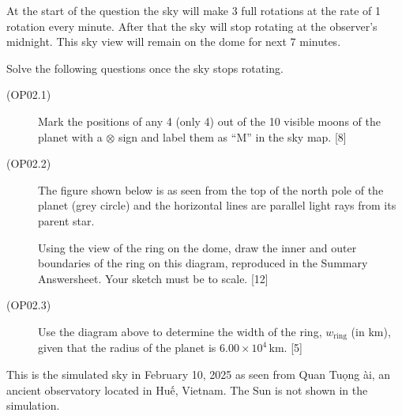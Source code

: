 At the start of the question the sky will make 3 full rotations at the rate
of 1 rotation every minute. After that the sky will stop rotating at the
observer's midnight. This sky view will remain on the dome for next 7
minutes.

Solve the following questions once the sky stops rotating.


\begin{description}
\item[(OP02.1)] Mark the positions of any 4 (only 4) out of the 10 visible
  moons of the planet with a $\otimes$ sign and label them as ``M'' in the
  sky map. \hfill[8]
\item[(OP02.2)] The figure shown below is as seen from the top of the north
  pole of the planet (grey circle) and the horizontal lines are parallel
  light rays from its parent star.


  Using the view of the ring on the dome, draw the inner and outer boundaries
  of the ring on this diagram, reproduced in the Summary Answersheet. Your
  sketch must be to scale. \hfill[12]
\item[(OP02.3)] Use the diagram above to determine the width of the ring,
  $w_{\mathrm{ring}}$ (in km), given that the radius of the planet is
  $6.00 \times 10^4$\,km. \hfill[5]
\end{description}

This is the simulated sky in February 10, 2025 as seen from Quan Tu\d{o}ng
\DJ\`ai, an ancient observatory located in Hu\'{\^e}, Vietnam. The Sun is not
shown in the simulation.

